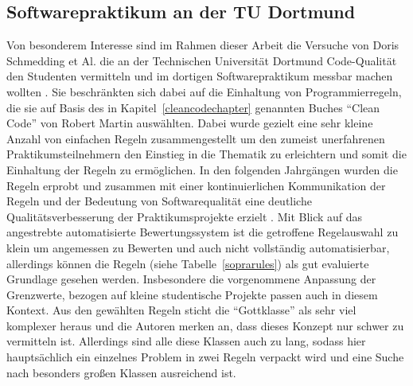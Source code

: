 \documentclass[da,ngerman]{stthesis}
\begin{document}
			\subsection{Softwarepraktikum an der TU Dortmund}
				Von besonderem Interesse sind im Rahmen dieser Arbeit die Versuche von Doris Schmedding et Al. die an der Technischen Universität Dortmund Code-Qualität den Studenten vermitteln und im dortigen Softwarepraktikum messbar machen wollten \cite{CleanCodeImPraktikum}. Sie beschränkten sich dabei auf die Einhaltung von Programmierregeln, die sie auf Basis des in Kapitel~\ref{cleancodechapter} genannten Buches "`Clean Code"' von Robert Martin auswählten. Dabei wurde gezielt eine sehr kleine Anzahl von einfachen Regeln zusammengestellt um den zumeist unerfahrenen Praktikumsteilnehmern den Einstieg in die Thematik zu erleichtern und somit die Einhaltung der Regeln zu ermöglichen. In den folgenden Jahrgängen wurden die Regeln erprobt und zusammen mit einer kontinuierlichen Kommunikation der Regeln und der Bedeutung von Softwarequalität eine deutliche Qualitätsverbesserung der Praktikumsprojekte erzielt \cite{ImproveCodeQuality}. \newline
				Mit Blick auf das angestrebte automatisierte Bewertungssystem ist die getroffene Regelauswahl zu klein um angemessen zu Bewerten und auch nicht vollständig automatisierbar, allerdings können die Regeln (siehe Tabelle~\ref{soprarules}) als gut evaluierte Grundlage gesehen werden. Insbesondere die vorgenommene Anpassung der Grenzwerte, bezogen auf kleine studentische Projekte passen auch in diesem Kontext. \newline
				Aus den gewählten Regeln sticht die "`Gottklasse"' als sehr viel komplexer heraus und die Autoren merken an, dass dieses Konzept nur schwer zu vermitteln ist. Allerdings sind alle diese Klassen auch zu lang, sodass hier hauptsächlich ein einzelnes Problem in zwei Regeln verpackt wird und eine Suche nach besonders großen Klassen ausreichend ist.\newline \newline
\end{document}
